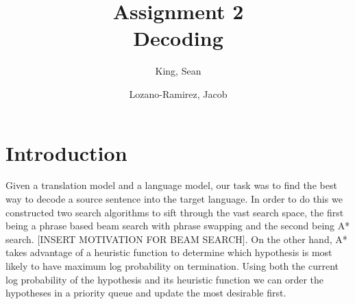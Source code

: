 \documentclass[11pt]{article}
\begin{document}
\title{Assignment 2\\Decoding}
\author{King, Sean \and Lozano-Ramirez, Jacob}
\date{}


\maketitle
\section{Introduction}
Given a translation model and a language model, our task was to find the best way to decode a source sentence into the target language. In order to do this we constructed two search algorithms to sift through the vast search space, the first being a phrase based beam search with phrase swapping and the second being A* search. [INSERT MOTIVATION FOR BEAM SEARCH]. On the other hand, A* takes advantage of a heuristic function to determine which hypothesis is most likely to have maximum log probability on termination. Using both the current log probability of the hypothesis and its heuristic function we can order the hypotheses in a priority queue and update the most desirable first.
\end{document}
